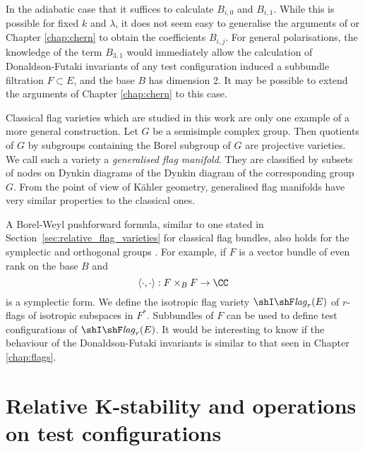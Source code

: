 	In the adiabatic case that it suffices to calculate $B_{i,0}$ and $B_{i,1}$. While this is possible for fixed $k$ and $λ$, it does not seem easy to generalise the arguments of \cite{manivel1994theoreme} or Chapter \ref{chap:chern} to obtain the coefficients $B_{i,j}$. For general polarisations, the knowledge of the term $B_{3,1}$ would immediately allow the calculation of Donaldson-Futaki invariants of any test configuration induced a subbundle filtration $F\subset E$, and the base $B$ has dimension 2. It may be possible to extend the arguments of Chapter \ref{chap:chern} to this case.
	
	Classical flag varieties which are studied in this work are only one example of a more general construction. Let $G$ be a semisimple complex group. Then quotients of $G$ by subgroups containing the Borel subgroup of $G$ are projective varieties. We call such a variety a \emph{generalised flag manifold}. They are classified by subsets of nodes on Dynkin diagrams of the Dynkin diagram of the corresponding group $G$. From the point of view of Kähler geometry, generalised flag manifolds have very similar properties to the classical ones.
	
	A Borel-Weyl pushforward formula, similar to one stated in Section~\ref{sec:relative_flag_varieties} for classical flag bundles, also holds for the symplectic and orthogonal groups \cite[Chapter 4]{Weyman}. For example, if $F$ is a vector bundle of even rank on the base $B$ and
	\begin{equation}
		\langle\cdot,\cdot\rangle: F\times_B F\rightarrow \CC 
	\end{equation}
	is a symplectic form. We define the isotropic flag variety $\mathop{\shI\shF\it{lag}}\nolimits_r(E)$ of $r$-flags of isotropic subspaces in $F^*$. Subbundles of $F$ can be used to define test configurations of $\mathop{\shI\shF\it{lag}}\nolimits_r(E)$. It would be interesting to know if the behaviour of the Donaldson-Futaki invariants is similar to that seen in Chapter \ref{chap:flags}. 
	

\section{Relative K-stability and operations on test configurations} %
\label{sec:operations_on_test_configurations}



